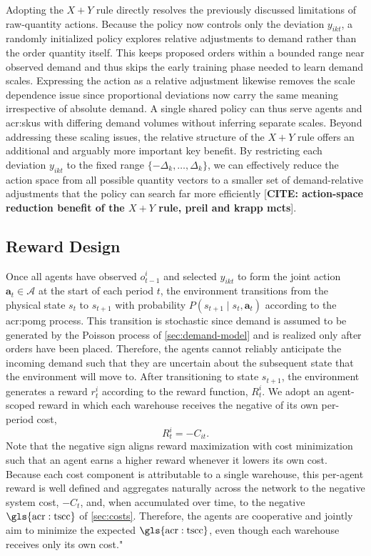 Adopting the $X+Y$ rule directly resolves the previously discussed limitations of raw-quantity actions. Because the policy now controls only the deviation $y_{ikt}$, a randomly initialized policy explores relative adjustments to demand rather than the order quantity itself. This keeps proposed orders within a bounded range near observed demand and thus skips the early training phase needed to learn demand scales. Expressing the action as a relative adjustment likewise removes the scale dependence issue since proportional deviations now carry the same meaning irrespective of absolute demand. A single shared policy can thus serve agents and \glspl{acr:sku} with differing demand volumes without inferring separate scales. Beyond addressing these scaling issues, the relative structure of the $X+Y$ rule offers an additional and arguably more important  key benefit. By restricting each deviation $y_{ikt}$ to the fixed range $\{-\Delta_k,\dots,\Delta_k\}$, we can effectively reduce the action space from all possible quantity vectors to a smaller set of demand-relative adjustments that the policy can search far more efficiently [\textbf{CITE: action-space reduction benefit of the $X+Y$ rule, preil and krapp mcts}].

\subsection{Reward Design}
\label{subsec:reward-design}
Once all agents have observed $o^i_{t-1}$ and selected $y_{ikt}$ to form the joint action $\mathbf{a}_t \in \mathcal{A}$ at the start of each period $t$, the environment transitions from the physical state $s_t$ to $s_{t+1}$ with probability $P(s_{t+1} \mid s_t, \mathbf{a}_t)$ according to the \gls{acr:pomg} process. This transition is stochastic since demand is assumed to be generated by the Poisson process of \autoref{sec:demand-model} and is realized only after orders have been placed. Therefore, the agents cannot reliably anticipate the incoming demand such that they are uncertain about the subsequent state that the environment will move to. 
After transitioning to state $s_{t+1}$, the environment generates a reward $r_t^i$ according to the reward function, $R^i_t$. We adopt an agent-scoped reward in which each warehouse receives the negative of its own per-period cost,
\begin{equation}
\label{eq:reward}
  R^i_t = -C_{it}.
\end{equation}
Note that the negative sign aligns reward maximization with cost minimization such that an agent earns a higher reward whenever it lowers its own cost. Because each cost component is attributable to a single warehouse, this per-agent reward is well defined and aggregates naturally across the network to the negative system cost, $-C_t$, and, when accumulated over time, to the negative $\mathrm{\gls{acr:tscc}}$ of \autoref{sec:costs}. Therefore, the agents are cooperative and jointly aim to minimize the expected $\mathrm{\gls{acr:tscc}}$, even though each warehouse receives only its own cost." 

